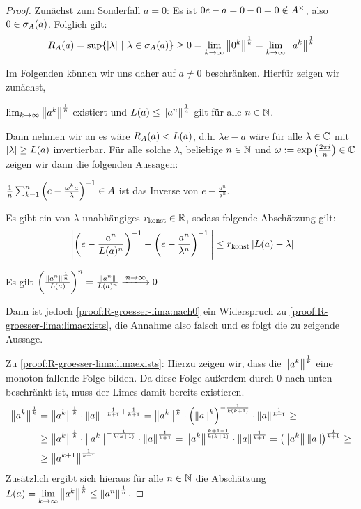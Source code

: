 \begin{proof}Zunächst zum Sonderfall $a = 0$: Es ist $0 e - a = 0 - 0 = 0 \notin A^\times$, also $0 \in \sigma_A(a)$. Folglich gilt:
	\[R_A(a) = \sup\{|\lambda| ~|~ \lambda \in \sigma_A(a)\} \geq 0 = \underset{k\to\infty}{\lim}\left\lVert0^k\right\rVert^\frac{1}{k} = \underset{k\to\infty}{\lim}\left\lVert a^k\right\rVert^\frac{1}{k}\]

Im Folgenden können wir uns daher auf $a \neq 0$ beschränken. Hierfür zeigen wir zunächst,
\begin{proofenum}
	\item \label{proof:R-groesser-lima:limaexists}
		$\lim_{k\to\infty}\left\lVert a^k\right\rVert^\frac{1}{k}$ existiert und $L(a) \leq \left\lVert a^n\right\rVert^\frac{1}{n}$ gilt für alle $n \in \mathbb{N}$.
\setcounter{temp}{\value{proofenumi}}
\end{proofenum}
Dann nehmen wir an es wäre $R_A(a) < L(a)$, d.h. $\lambda e - a$ wäre für alle $\lambda \in \mathbb{C}$ mit $|\lambda| \geq L(a)$ invertierbar. Für alle solche $\lambda$, beliebige $n \in \mathbb{N}$ und $\omega := \textup{exp}\left(\frac{2\pi i}{n}\right) \in \mathbb{C}$ zeigen wir dann die folgenden Aussagen: 
\begin{proofenum}
\setcounter{proofenumi}{\value{temp}}
	\item \label{proof:R-groesser-lima:invertierbar}
		$\frac{1}{n}\sum_{k=1}^n \left(e-\frac{\omega^k a}{\lambda}\right)^{-1} \in A$ ist das Inverse von $e - \frac{a^n}{\lambda^n}$.
	\item \label{proof:R-groesser-lima:abschaetzung}
		Es gibt ein von $\lambda$ unabhängiges $r_\textup{konst} \in \mathbb{R}$, sodass folgende Abschätzung gilt:
		\[\left\lVert\left(e - \frac{a^n}{L(a)^n}\right)^{-1} - \left(e - \frac{a^n}{\lambda^n}\right)^{-1}\right\rVert \leq r_\textup{konst}\left|L(a) - \lambda\right|\]
	\item \label{proof:R-groesser-lima:nach0}
		Es gilt $\left(\frac{\norm{a^n}^\frac{1}{n}}{\lima}\right)^n = \frac{\norm{a^n}}{\lima^n} \xlongrightarrow{n\to\infty} 0$
\end{proofenum}
Dann ist jedoch \ref{proof:R-groesser-lima:nach0} ein Widerspruch zu \ref{proof:R-groesser-lima:limaexists}, die Annahme also falsch und es folgt die zu zeigende Aussage.

Zu \ref{proof:R-groesser-lima:limaexists}: Hierzu zeigen wir, dass die $\left\lVert a^k\right\rVert^\frac{1}{k}$ eine monoton fallende Folge bilden. Da diese Folge außerdem durch $0$ nach unten beschränkt ist, muss der Limes damit bereits existieren.
\begin{align*}
	\left\lVert a^k\right\rVert^\frac{1}{k} &= \left\lVert a^k\right\rVert^\frac{1}{k}\cdot\left\lVert a\right\rVert^{-\frac{1}{k+1}+\frac{1}{k+1}} = \left\lVert a^k\right\rVert^\frac{1}{k}\cdot\left(\left\lVert a\right\rVert^k\right)^{-\frac{1}{k(k+1)}}\cdot\left\lVert a\right\rVert^{\frac{1}{k+1}} \geq \\
	&\geq \left\lVert a^k\right\rVert^\frac{1}{k}\cdot\left\lVert a^k\right\rVert^{-\frac{1}{k(k+1)}}\cdot\left\lVert a\right\rVert^{\frac{1}{k+1}} = \left\lVert a^k\right\rVert^{\frac{k+1-1}{k(k+1)}}\cdot\left\lVert a\right\rVert^{\frac{1}{k+1}} = \left(\left\lVert a^k\right\rVert\left\lVert a\right\rVert\right)^{\frac{1}{k+1}} \geq \\
	&\geq \left\lVert a^{k+1}\right\rVert^\frac{1}{k+1}
	\end{align*}
Zusätzlich ergibt sich hieraus für alle $n \in \mathbb{N}$ die Abschätzung $L(a) = \underset{k\to\infty}{\lim}\left\lVert a^k\right\rVert^\frac{1}{k} \leq \left\lVert a^n\right\rVert^\frac{1}{n}$.


\end{proof}
